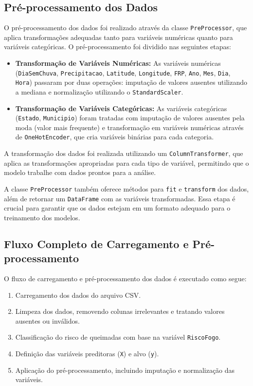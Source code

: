 \subsection{Pré-processamento dos Dados}

O pré-processamento dos dados foi realizado através da classe \texttt{PreProcessor}, que aplica transformações adequadas tanto para variáveis numéricas quanto para variáveis categóricas. O pré-processamento foi dividido nas seguintes etapas:

\begin{itemize}
    \item \textbf{Transformação de Variáveis Numéricas:} As variáveis numéricas (\texttt{DiaSemChuva}, \texttt{Precipitacao}, \texttt{Latitude}, \texttt{Longitude}, \texttt{FRP}, \texttt{Ano}, \texttt{Mes}, \texttt{Dia}, \texttt{Hora}) passaram por duas operações: imputação de valores ausentes utilizando a mediana e normalização utilizando o \texttt{StandardScaler}.
    \item \textbf{Transformação de Variáveis Categóricas:} As variáveis categóricas (\texttt{Estado}, \texttt{Municipio}) foram tratadas com imputação de valores ausentes pela moda (valor mais frequente) e transformação em variáveis numéricas através de \texttt{OneHotEncoder}, que cria variáveis binárias para cada categoria.
\end{itemize}

A transformação dos dados foi realizada utilizando um \texttt{ColumnTransformer}, que aplica as transformações apropriadas para cada tipo de variável, permitindo que o modelo trabalhe com dados prontos para a análise.

A classe \texttt{PreProcessor} também oferece métodos para \texttt{fit} e \texttt{transform} dos dados, além de retornar um \texttt{DataFrame} com as variáveis transformadas. Essa etapa é crucial para garantir que os dados estejam em um formato adequado para o treinamento dos modelos.

\subsection{Fluxo Completo de Carregamento e Pré-processamento}

O fluxo de carregamento e pré-processamento dos dados é executado como segue:

\begin{enumerate}
    \item Carregamento dos dados do arquivo CSV.
    \item Limpeza dos dados, removendo colunas irrelevantes e tratando valores ausentes ou inválidos.
    \item Classificação do risco de queimadas com base na variável \texttt{RiscoFogo}.
    \item Definição das variáveis preditoras (\texttt{X}) e alvo (\texttt{y}).
    \item Aplicação do pré-processamento, incluindo imputação e normalização das variáveis.
\end{enumerate}

